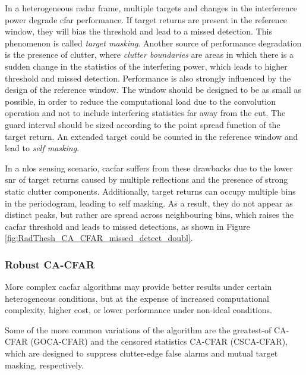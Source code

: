 In a heterogeneous radar frame, multiple targets and changes in the interference power degrade \gls{cfar} performance. If target returns are present in the reference window, they will bias the threshold and lead to a missed detection. This phenomenon is called \textit{target masking}. Another source of performance degradation is the presence of clutter, where \textit{clutter boundaries} are areas in which there is a sudden change in the statistics of the interfering power, which leads to higher threshold and missed detection.
Performance is also strongly influenced by the design of the reference window. The window should be designed to be as small as possible, in order to reduce the computational load due to the convolution operation and not to include interfering statistics far away from the \gls{cut}. The guard interval should be sized according to the point spread function of the target return. An extended target could be counted in the reference window and lead to \textit{self masking}.

In a \gls{nlos} sensing scenario, \gls{cacfar} suffers from these drawbacks due to the lower \gls{snr} of target returns caused by multiple reflections and the presence of strong static clutter components.
Additionally, target returns can occupy multiple bins in the periodogram, leading to self masking. 
As a result, they do not appear as distinct peaks, but rather are spread across neighbouring bins, which raises the \gls{cacfar} threshold and leads to missed detections, as shown in Figure \ref{fig:RadThesh_CA_CFAR_missed_detect_doubl}.

\subsubsection{Robust CA-CFAR}
More complex \gls{cacfar} algorithms may provide better results under certain heterogeneous conditions, but at the expense of increased computational complexity, higher cost, or lower performance under non-ideal conditions.

Some of the more common variations of the algorithm are the greatest-of CA-CFAR (GOCA-CFAR) and the censored statistics CA-CFAR (CSCA-CFAR), which are designed to suppress clutter-edge false alarms and mutual target masking, respectively.

